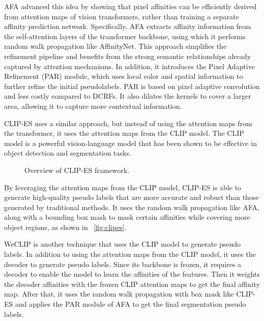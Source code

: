 AFA \cite{wsss_afa_affinity_from_attention} advanced this idea by showing that pixel affinities can be efficiently derived from attention maps of vision transformers, rather than training a separate affinity prediction network. Specifically, AFA extracts affinity information from the self-attention layers of the transformer backbone, using which it performs random walk propagation like AffinityNet. This approach simplifies the refinement pipeline and benefits from the strong semantic relationships already captured by attention mechanisms. In addition, it introduces the Pixel Adaptive Refinement (PAR) module, which uses local color and spatial information to further refine the initial pseudolabels. PAR is based on pixel adaptive convolution and less costly compared to DCRFs. It also dilates the kernels to cover a larger area, allowing it to capture more contextual information.

CLIP-ES \cite{wsss_clip_es} uses a similar approach, but instead of using the attention maps from the transformer, it uses the attention maps from the CLIP model. The CLIP model is a powerful vision-language model that has been shown to be effective in object detection and segmentation tasks. 
\begin{figure}[htbp]
    \centering
    \caption{Overview of CLIP-ES framework.}
    \label{fig:clipes}
\end{figure}
By leveraging the attention maps from the CLIP model, CLIP-ES is able to generate high-quality pseudo labels that are more accurate and robust than those generated by traditional methods. It uses the random walk propagation like AFA, along with a bounding box mask to mask certain affinities while covering more object regions, as shown in ~\autoref{fig:clipes}.

WeCLIP\cite{wsss_frozen_clip} is another technique that uses the CLIP model to generate pseudo labels. In addition to using the attention maps from the CLIP model, it uses the decoder to generate pseudo labels. Since its backbone is frozen, it requires a decoder to enable the model to learn the affinities of the features. Then it weights the decoder affinities with the frozen CLIP attention maps to get the final affinity map. After that, it uses the random walk propagation with box mask like CLIP-ES and applies the PAR module of AFA to get the final segmentation pseudo labels.
